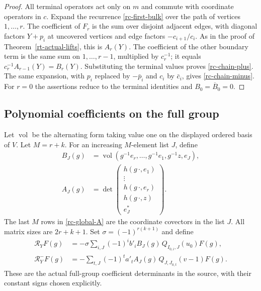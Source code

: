 \begin{proof}
All terminal operators act only on $m$ and commute
with coordinate operators in $c$.
Expand the recurrence \eqref{rc-first-bulk}
over the path of vertices $1,\ldots,r$.
The coefficient of $F_r$ is the sum over
disjoint adjacent edges, with diagonal factors
$Y+p_i$ at uncovered vertices and edge
factors $-c_{i+1}/c_i$.
As in the proof of Theorem~\ref{rt-actual-lifts},
this is $A_r(Y)$.
The coefficient of the other boundary term is
the same sum on $1,\ldots,r-1$, multiplied by
$c_r^{-1}$; it equals
$c_r^{-1}A_{r-1}(Y)=B_r(Y)$.
Substituting the terminal values proves
\eqref{rc-chain-plus}.
The same expansion, with $p_i$ replaced by
$-\bar p_i$ and $c_i$ by $\bar c_i$, gives
\eqref{rc-chain-minus}.
For $r=0$ the assertions reduce to the terminal
identities and $B_0=\overline B_0=0$.
\end{proof}

\subsection{Polynomial coefficients on the full group}

Let $\operatorname{vol}$ be the alternating
form taking value one on the displayed ordered
basis of $V$.  Let $M=r+k$.
For an increasing $M$-element list $J$, define
\begin{align}
 B_J(g)&=\operatorname{vol}
       (g^{-1}e_r,\ldots,g^{-1}e_1,g^{-1}z,e_J),
                                                     \label{rc-global-B}\\
 A_J(g)&=\det
       \begin{pmatrix}
        h(g\,\cdot,e_1)\\[-2pt]
        \vdots\\
        h(g\,\cdot,e_r)\\
        h(g\,\cdot,z)\\
        e_J^*
       \end{pmatrix}.
                                                     \label{rc-global-A}
\end{align}
The last $M$ rows in \eqref{rc-global-A}
are the coordinate covectors in the list $J$.
All matrix sizes are $2r+k+1$.
Set $\sigma=(-1)^{r(k+1)}$ and define
\begin{align}
 \mathcal R_Y F(g)
  &=-\sigma\sum_{i,J}(-1)^i b'_i B_J(g)\,
                 Q_{I_{0,i},J}(u_0)F(g),
                                                     \label{rc-global-R}\\
 \mathcal R_Y^- F(g)
  &=-\sum_{t,J}(-1)^t a'_t A_J(g)\,
                 Q_{J,J_{0,t}}(v-1)F(g).
                                                     \label{rc-global-Rminus}
\end{align}
These are the actual full-group coefficient
determinants in the source, with their constant
signs chosen explicitly.

